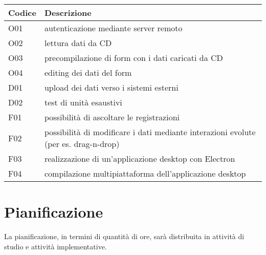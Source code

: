 \begin{center}
  \renewcommand{\arraystretch}{1.8} %
  \begin{tabular}{ |l|l| }
    \hline
    \textbf{Codice} & \textbf{Descrizione}                                                                \\
    \hline
    O01             & autenticazione mediante server remoto                                               \\
    \hline
    O02             & lettura dati da CD                                                                  \\
    \hline
    O03             & precompilazione di form con i dati caricati da CD                                   \\
    \hline
    O04             & editing dei dati del form                                                           \\
    \hline
    D01             & upload dei dati verso i sistemi esterni                                             \\
    \hline
    D02             & test di unità esaustivi                                                             \\
    \hline
    F01             & possibilità di ascoltare le registrazioni                                           \\
    \hline
    F02             & possibilità di modificare i dati mediante interazioni evolute (per es. drag-n-drop) \\
    \hline
    F03             & realizzazione di un'applicazione desktop con Electron                               \\
    \hline
    F04             & compilazione multipiattaforma dell'applicazione desktop                             \\
    \hline
  \end{tabular}
\end{center}

\section{Pianificazione}

La pianificazione, in termini di quantità di ore, sarà distribuita in attività di studio e attività implementative.


